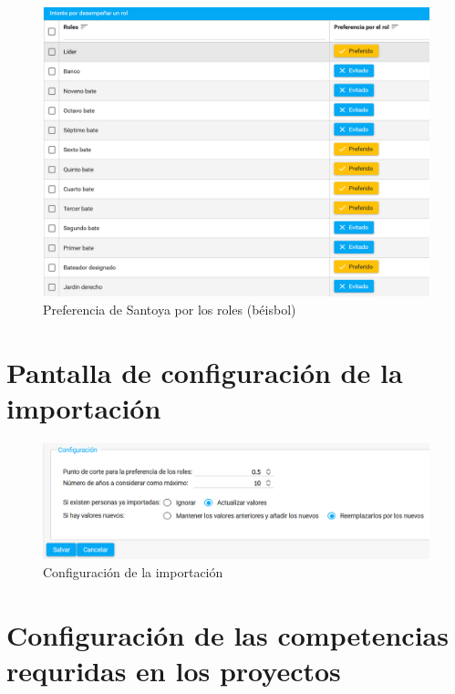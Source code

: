 {\begin{figure}[H]
	\centering
	\includegraphics[width=\textwidth]{figuras/beisbol_santoya_roles.png}
	\caption{Preferencia de Santoya por los roles (béisbol)} \label{fig:pref_roles_beisbol}
\end{figure}

\chapter{Pantalla de configuración de la importación}
\begin{figure}[H]
	\centering
	\includegraphics[width=\textwidth]{figuras/configuracion_importacion.png}
	\caption{Configuración de la importación} \label{fig:configuracion-problemas}
\end{figure}

\chapter{Configuración de las competencias requridas en los proyectos}

}

